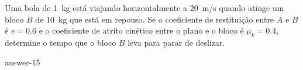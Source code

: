 \item Uma bola de \SI{1}{\kilogram} está viajando horizontalmente a \SI{20}{\meter/\second} quando atinge um bloco $B$ de \SI{10}{\kilogram} que está em repouso. Se o coeficiente de restituição entre $A$ e $B$ é $e=0.6$ e o coeficiente de atrito cinético entre o plano e o bloco é $\mu_{k}=0.4$, determine o tempo que o bloco $B$ leva para parar de deslizar.

{answer-15}